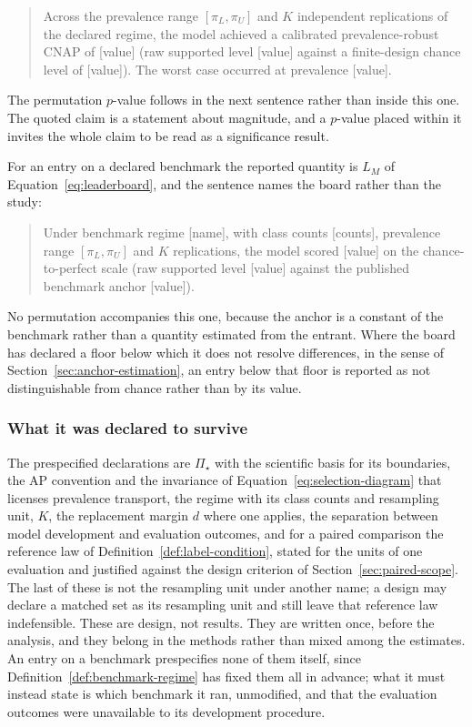 \documentclass[11pt]{article}
\newcommand{\PSet}{\Pi_\star}
\theoremstyle{remark}
\begin{document}
\begin{quote}
Across the prevalence range $[\pi_L,\pi_U]$ and $K$ independent replications of the declared regime, the model achieved a calibrated prevalence-robust CNAP of [value] (raw supported level [value] against a finite-design chance level of [value]). The worst case occurred at prevalence [value].
\end{quote}

The permutation $p$-value follows in the next sentence rather than inside this one. The quoted claim is a statement about magnitude, and a $p$-value placed within it invites the whole claim to be read as a significance result.

For an entry on a declared benchmark the reported quantity is $L_M$ of Equation~\eqref{eq:leaderboard}, and the sentence names the board rather than the study:

\begin{quote}
Under benchmark regime [name], with class counts [counts], prevalence range $[\pi_L,\pi_U]$ and $K$ replications, the model scored [value] on the chance-to-perfect scale (raw supported level [value] against the published benchmark anchor [value]).
\end{quote}

No permutation accompanies this one, because the anchor is a constant of the benchmark rather than a quantity estimated from the entrant. Where the board has declared a floor below which it does not resolve differences, in the sense of Section~\ref{sec:anchor-estimation}, an entry below that floor is reported as not distinguishable from chance rather than by its value.

\subsubsection*{What it was declared to survive}

The prespecified declarations are $\PSet$ with the scientific basis for its boundaries, the AP convention and the invariance of Equation~\eqref{eq:selection-diagram} that licenses prevalence transport, the regime with its class counts and resampling unit, $K$, the replacement margin $d$ where one applies, the separation between model development and evaluation outcomes, and for a paired comparison the reference law of Definition~\ref{def:label-condition}, stated for the units of one evaluation and justified against the design criterion of Section~\ref{sec:paired-scope}. The last of these is not the resampling unit under another name; a design may declare a matched set as its resampling unit and still leave that reference law indefensible. These are design, not results. They are written once, before the analysis, and they belong in the methods rather than mixed among the estimates. An entry on a benchmark prespecifies none of them itself, since Definition~\ref{def:benchmark-regime} has fixed them all in advance; what it must instead state is which benchmark it ran, unmodified, and that the evaluation outcomes were unavailable to its development procedure.
\end{document}
